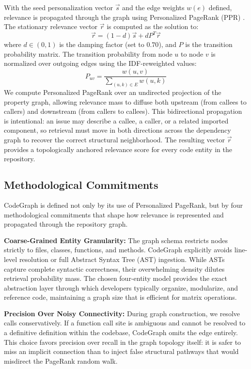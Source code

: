 With the seed personalization vector $\vec{s}$ and the edge weights $w(e)$ defined, relevance is propagated through the graph using Personalized PageRank (PPR) \cite{jeh2003ppr}. The stationary relevance vector $\vec{r}$ is computed as the solution to:
\begin{equation}
    \vec{r} = (1 - d) \vec{s} + d P^T \vec{r}
    \label{eq:ppr}
\end{equation}
where $d \in (0,1)$ is the damping factor (set to $0.70$), and $P$ is the transition probability matrix. The transition probability from node $u$ to node $v$ is normalized over outgoing edges using the IDF-reweighted values:
\begin{equation}
    P_{uv} = \frac{w(u, v)}{\sum_{(u, k) \in E} w(u, k)}
    \label{eq:transition}
\end{equation}
We compute Personalized PageRank over an undirected projection of the property graph, allowing relevance mass to diffuse both upstream (from callees to callers) and downstream (from callers to callees). This bidirectional propagation is intentional: an issue may describe a callee, a caller, or a related imported component, so retrieval must move in both directions across the dependency graph to recover the correct structural neighborhood. The resulting vector $\vec{r}$ provides a topologically anchored relevance score for every code entity in the repository.

\subsection{Methodological Commitments}

CodeGraph is defined not only by its use of Personalized PageRank, but by four methodological commitments that shape how relevance is represented and propagated through the repository graph.

\textbf{Coarse-Grained Entity Granularity:} The graph schema restricts nodes strictly to files, classes, functions, and methods. CodeGraph explicitly avoids line-level resolution or full Abstract Syntax Tree (AST) ingestion. While ASTs capture complete syntactic correctness, their overwhelming density dilutes retrieval probability mass. The chosen four-entity model provides the exact abstraction layer through which developers typically organize, modularize, and reference code, maintaining a graph size that is efficient for matrix operations.

\textbf{Precision Over Noisy Connectivity:} During graph construction, we resolve calls conservatively. If a function call site is ambiguous and cannot be resolved to a definitive definition within the codebase, CodeGraph omits the edge entirely. This choice favors precision over recall in the graph topology itself: it is safer to miss an implicit connection than to inject false structural pathways that would misdirect the PageRank random walk. 

